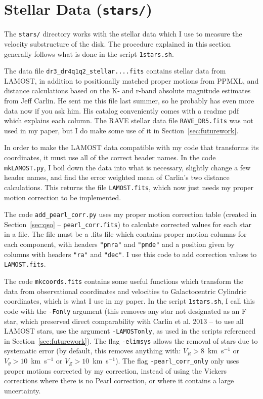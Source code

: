 \documentclass{article}
\begin{document}
\section{Stellar Data (\texttt{stars/})}

The \texttt{stars/} directory works with the stellar data which I use to measure the velocity substructure of the disk. The procedure explained in this section generally follows what is done in the script \texttt{1stars.sh}.

The data file \texttt{dr3\_dr4q1q2\_stellar....fits} contains stellar data from LAMOST, in addition to positionally matched proper motions from PPMXL, and distance calculations based on the K- and r-band absolute magnitude estimates from Jeff Carlin. He sent me this file last summer, so he probably has even more data now if you ask him. His catalog conveniently comes with a readme pdf which explains each column. The RAVE stellar data file \texttt{RAVE\_DR5.fits} was not used in my paper, but I do make some use of it in Section~\ref{sec:futurework}.

In order to make the LAMOST data compatible with my code that transforms its coordinates, it must use all of the correct header names. In the code \texttt{mkLAMOST.py}, I boil down the data into what is necessary, slightly change a few header names, and find the error weighted mean of Carlin's two distance calculations. This returns the file \texttt{LAMOST.fits}, which now just needs my proper motion correction to be implemented.

The code \texttt{add\_pearl\_corr.py} uses my proper motion correction table (created in Section~\ref{sec:qso} -- \texttt{pearl\_corr.fits}) to calculate corrected values for each star in a file. The file must be a .fits file which contains proper motion columns for each component, with headers \texttt{"pmra"} and \texttt{"pmde"} and a position given by columns with headers \texttt{"ra"} and \texttt{"dec"}. I use this code to add correction values to \texttt{LAMOST.fits}.

The code \texttt{mkcoords.fits} contains some useful functions which transform the data from observational coordinates and velocities to Galactocentric Cylindric coordinates, which is what I use in my paper. In the script \texttt{1stars.sh}, I call this code with the \texttt{-Fonly} argument (this removes any star not designated as an F star, which preserved direct comparability with Carlin et al. 2013 -- to use all LAMOST stars, use the argument \texttt{-LAMOSTonly}, as used in the scripts referenced in Section~\ref{sec:futurework}). The flag \texttt{-elimsys} allows the removal of stars due to systematic error (by default, this removes anything with: $V_R > 8$~km~s$^{-1}$ or $V_\theta > 10$~km~s$^{-1}$ or $V_Z > 10$~km~s$^{-1}$). The flag \texttt{-pearl\_corr\_only} only uses proper motions corrected by my correction, instead of using the Vickers corrections where there is no Pearl correction, or where it contains a large uncertainty.
\end{document}
